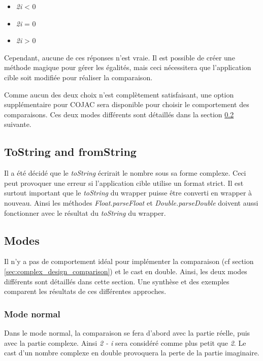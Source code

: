 \begin{itemize}
    \item \textit{2i} < 0
    \item \textit{2i} = 0
    \item \textit{2i} > 0
\end{itemize}

Cependant, aucune de ces réponses n'est vraie. Il est possible de créer une méthode magique pour gérer les égalités, mais ceci nécessitera que l'application cible soit modifiée pour réaliser la comparaison.

Comme aucun des deux choix n'est complètement satisfaisant, une option supplémentaire pour COJAC \cite{COJAC} sera disponible pour choisir le comportement des comparaisons. Ces deux modes différents sont détaillés dans la section \ref{sec:complex_design_modes} suivante.

\subsection{ToString and fromString}

Il a été décidé que le \textit{toString} écrirait le nombre sous sa forme complexe. Ceci peut provoquer une erreur si l'application cible utilise un format strict. Il est surtout important que le \textit{toString} du wrapper puisse être converti en wrapper à nouveau. Ainsi les méthodes \textit{Float.parseFloat} et \textit{Double.parseDouble} doivent aussi fonctionner avec le résultat du \textit{toString} du wrapper.

\subsection{Modes}
\label{sec:complex_design_modes}

Il n'y a pas de comportement idéal pour implémenter la comparaison (cf section \ref{sec:complex_design_comparison}) et le cast en double. Ainsi, les deux modes différents sont détaillés dans cette section. Une synthèse et des exemples comparent les résultats de ces différentes approches.

\subsubsection{Mode normal}

Dans le mode normal, la comparaison se fera d'abord avec la partie réelle, puis avec la partie complexe. Ainsi \textit{2 - i} sera considéré comme plus petit que \textit{2}. Le cast d'un nombre complexe en double provoquera la perte de la partie imaginaire.


